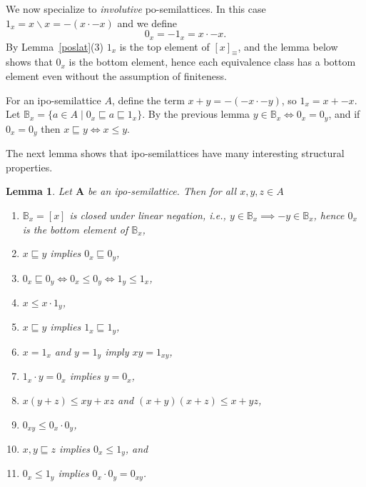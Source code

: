 \documentclass[12pt]{amsart}
\newtheorem{lemma}[theorem]{Lemma}
\newcommand{\m}{\mathbf} %
\newcommand{\ld}{{\backslash}}
\begin{document}
We now specialize to \emph{involutive} po-semilattices. In this case $1_x=x\ld x=-(x\cdot -x)$
and we define $$0_x=-1_x=x\cdot -x.$$
By Lemma~\ref{poslat}(3) $1_x$
is the top element of $[x]_\equiv$, and the lemma below shows that $0_x$ is the bottom element,
hence each equivalence class has a bottom element even without the assumption of finiteness.

For an ipo-semilattice $A$, define the term $x+y=-(-x\cdot-y)$, so
$1_x=x+-x$. Let $\mathbb B_x=\{a\in A\mid 0_x\sqsubseteq a\sqsubseteq 1_x\}$.
By the previous lemma $y\in \mathbb B_x\iff 0_x=0_y$, and if $0_x=0_y$ then $x\sqsubseteq y\iff x\le y$.

The next lemma shows that ipo-semilattices have many interesting structural properties.

\begin{lemma} \label{props} Let $\m A$ be an ipo-semilattice. Then for all $x,y,z\in A$
\begin{enumerate}
\item $\mathbb B_x=[x]$ is closed under linear negation, i.e.,  $y\in \mathbb B_x\implies -y\in \mathbb B_x$, hence $0_x$ is the bottom element of $\mathbb B_x$,
\item $x\sqsubseteq y$ implies $0_x\sqsubseteq 0_y$,
\item $0_x\sqsubseteq 0_y \iff 0_x\le 0_y \iff 1_y\le 1_x$,
\item $x\le x\cdot 1_y$,
\item $x\sqsubseteq y$ implies $1_x\sqsubseteq 1_y$,
\item $x=1_x$ and $y=1_y$ imply $xy=1_{xy}$,
\item $1_x\cdot y=0_x$ implies $y=0_x$,
\item $x(y+z)\le xy+xz$ and $(x+y)(x+z)\le x+yz$,
\item $0_{xy}\le 0_x\cdot 0_y$,
\item $x,y\sqsubseteq z$ implies $0_x\le 1_y$, and
\item $0_x\le 1_y$ implies $0_x\cdot 0_y=0_{xy}$.
\end{enumerate}
\end{lemma}
\end{document}
